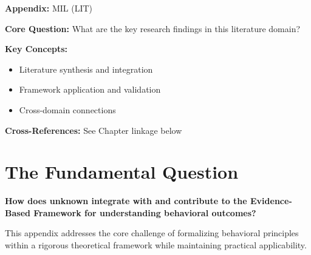 
\begin{tcolorbox}[colback=blue!5!white, colframe=blue!75!black,
    title=Quick Reference: Appendix UNMAPPED_MIL]
\textbf{Appendix:} MIL (LIT)

\textbf{Core Question:} What are the key research findings in this literature domain?

\textbf{Key Concepts:}
\begin{itemize}[nosep]
\item Literature synthesis and integration
\item Framework application and validation
\item Cross-domain connections
\end{itemize}

\textbf{Cross-References:} See Chapter linkage below
\end{tcolorbox}


\begin{abstract}
This appendix provides a systematic review and integration of key research findings
in the LIT domain. It synthesizes literature relevant to the Evidence-Based
Framework (EBF) and identifies connections to the 10C CORE architecture.
\end{abstract}

\section{The Fundamental Question}
\label{sec:mil-fundamental}

\begin{tcolorbox}[
    colback=red!5!white,
    colframe=red!75!black,
    title={\textbf{Fundamental Question}}
]
\textbf{How does unknown integrate with and contribute to the
Evidence-Based Framework for understanding behavioral outcomes?}

This appendix addresses the core challenge of formalizing behavioral principles
within a rigorous theoretical framework while maintaining practical applicability.
\end{tcolorbox}



